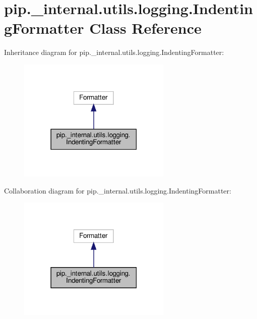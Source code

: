 \hypertarget{classpip_1_1__internal_1_1utils_1_1logging_1_1IndentingFormatter}{}\section{pip.\+\_\+internal.\+utils.\+logging.\+Indenting\+Formatter Class Reference}
\label{classpip_1_1__internal_1_1utils_1_1logging_1_1IndentingFormatter}


Inheritance diagram for pip.\+\_\+internal.\+utils.\+logging.\+Indenting\+Formatter\+:
\nopagebreak
\begin{figure}[H]
\begin{center}
\leavevmode
\includegraphics[width=207pt]{classpip_1_1__internal_1_1utils_1_1logging_1_1IndentingFormatter__inherit__graph}
\end{center}
\end{figure}


Collaboration diagram for pip.\+\_\+internal.\+utils.\+logging.\+Indenting\+Formatter\+:
\nopagebreak
\begin{figure}[H]
\begin{center}
\leavevmode
\includegraphics[width=207pt]{classpip_1_1__internal_1_1utils_1_1logging_1_1IndentingFormatter__coll__graph}
\end{center}
\end{figure}
